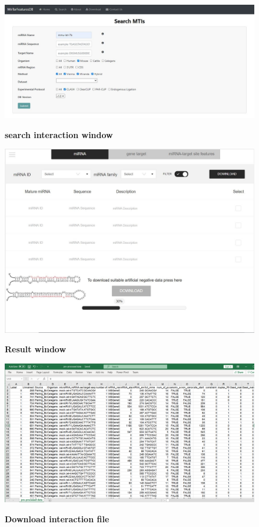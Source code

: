 \begin{figure}[h!]
  \caption{\textbf{search interaction window}}
      \includegraphics[width = 1\textwidth]{db figures/search interaction window.jpg}
      \label{fig:search}
          \end{figure}



\begin{figure}[h!]
  \caption{\textbf{Result window}}
      \includegraphics[width = 1\textwidth]{db figures/result.jpg}
      \label{fig:dbresult}
          \end{figure}



\begin{figure}[h!]
  \caption{\textbf{Download interaction file}}
      \includegraphics[width = 1\textwidth]{db figures/download.png}
      \label{fig:download}
          \end{figure}


